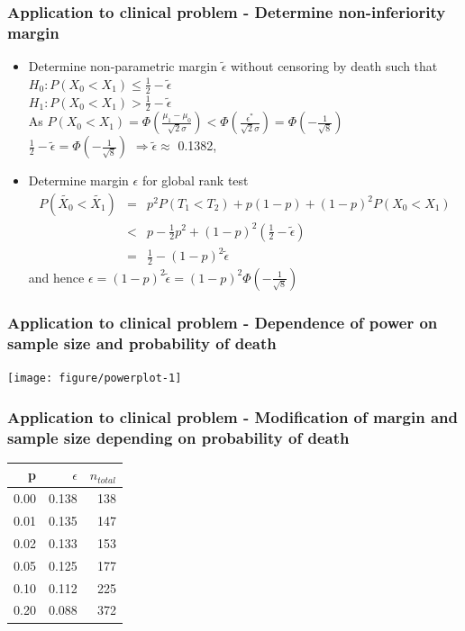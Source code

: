 \documentclass[xcolor=pdftex,dvipsnames,table]{beamer}\usepackage[]{graphicx}\usepackage[]{color}
\newenvironment{knitrout}{}{} %
\begin{document}
\begin{frame}[fragile] %
\frametitle{Application to clinical problem - Determine non-inferiority margin}
\begin{itemize}
\item Determine non-parametric margin $\tilde{\epsilon}$ without censoring by death such that\\
        $H_0: P(X_0 < X_1) \leq \frac{1}{2} - \tilde{\epsilon}$ \\
        $H_1: P(X_0 < X_1) > \frac{1}{2} - \tilde{\epsilon}$ \\
        As $P(X_0 < X_1) = \Phi(\frac{\mu_1 - \mu_0}{\sqrt{2}\sigma}) < \Phi(\frac{\epsilon^{*}}{\sqrt{2}\sigma}) = \Phi(-\frac{1}{\sqrt{8}}) $ \\
      $\frac{1}{2} - \tilde{\epsilon} = \Phi(-\frac{1}{\sqrt{8}}) $ 
      $\Rightarrow \tilde{\epsilon} \approx $ 0.1382, \item Determine margin $\epsilon$ for global rank test
\begin{eqnarray*}
P(\tilde{X_0}  < \tilde{X_1}) & = & p^2 P(T_1 < T_2) + p(1-p) + (1 - p)^2 P(X_0 < X_1) \\
& < & p - \frac{1}{2}p^2 + (1-p)^2 (\frac{1}{2} - \tilde{\epsilon}) \\
& = & \frac{1}{2} - (1-p)^2 \tilde{\epsilon}
\end{eqnarray*}
and hence $\epsilon = (1-p)^2 \tilde{\epsilon} = (1-p)^2 \Phi(-\frac{1}{\sqrt{8}})$
\end{itemize}
\end{frame}


\begin{frame}[fragile] %
\frametitle{Application to clinical problem - Dependence of power on sample size and probability of death}

\begin{knitrout}
\color{fgcolor}
\texttt{[image: figure/powerplot-1]} 

\end{knitrout}
\end{frame}

\begin{frame}[fragile] %
\frametitle{Application to clinical problem - Modification of margin and sample size depending on probability of death}

\begin{table}[ht]
\centering
\begin{tabular}{rrr}
  \hline
p & $\epsilon$ & $n_{total}$ \\ 
  \hline
0.00 & 0.138 & 138 \\ 
  0.01 & 0.135 & 147 \\ 
  0.02 & 0.133 & 153 \\ 
  0.05 & 0.125 & 177 \\ 
  0.10 & 0.112 & 225 \\ 
  0.20 & 0.088 & 372 \\ 
   \hline
\end{tabular}
\end{table}

\end{frame}
\end{document}
